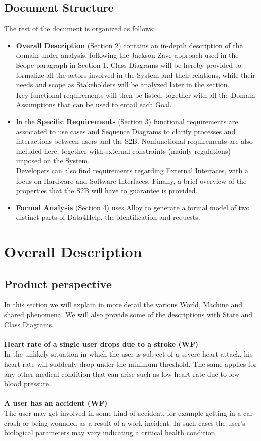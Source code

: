 \documentclass[titlepage]{article}
\begin{document}
	\subsection{Document Structure}
			The rest of the document is organized as follows:
				\begin{itemize}
					\item {\bf Overall Description} (Section 2) contains an in-depth description of the domain under analysis, following the Jackson-Zave approach used in the Scope paragraph in Section 1. Class Diagrams will be hereby provided to formalize all the actors involved in the System and their relations, while their needs and scope as Stakeholders will be analyzed later in the section.\\
Key functional requirements will then be listed, together with all the Domain Assumptions that can be used to entail each Goal.
					\item In the {\bf Specific Requirements} (Section 3) functional requirements are associated to use cases and Sequence Diagrams to clarify processes and interactions between users and the S2B. Nonfunctional requirements are also included here, together with external constraints (mainly regulations) imposed on the System.\\
Developers can also find requirements regarding External Interfaces, with a focus on Hardware and Software Interfaces. Finally, a brief overview of the properties that the S2B will have to guarantee is provided.
					\item {\bf Formal Analysis} (Section 4) uses Alloy to generate a formal model of two distinct parts of Data4Help, the identification and requests.
				\end{itemize}

\pagebreak	
	
\section{Overall Description}
	\subsection{Product perspective}
In this section we will explain in more detail the various World, Machine and shared phenomena. We will also provide some of the descriptions with State and Class Diagrams.\\ \\
	{\bf Heart rate of a single user drops due to a stroke (WF) }\\ 
	In the unlikely situation in which the user is subject of a severe heart attack, his heart rate will suddenly drop under the minimum threshold. The same applies for any other medical condition that can arise such as low heart rate due to low blood pressure.\\ \\
	{\bf A user has an accident (WF)}\\
	The user may get involved in some kind of accident, for example getting in a car crash or being wounded as a result of a work incident. In such cases the user’s biological parameters may vary indicating a critical health condition.\\ 
\end{document}
